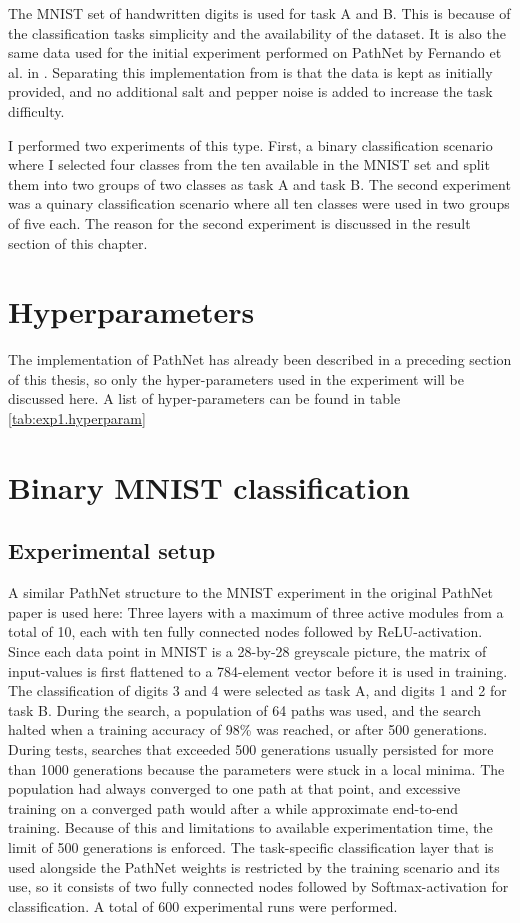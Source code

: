 The MNIST set of handwritten digits is used for task A and B. This is because of the classification tasks simplicity and the availability of the dataset. It is also the same data used for the initial experiment performed on PathNet by Fernando et al. in \cite{pathnet}. Separating this implementation from \cite{pathnet} is that the data is kept as initially provided, and no additional salt and pepper noise is added to increase the task difficulty. 


I performed two experiments of this type. First, a binary classification scenario where I selected four classes from the ten available in the MNIST set and split them into two groups of two classes as task A and task B. The second experiment was a quinary classification scenario where all ten classes were used in two groups of five each. The reason for the second experiment is discussed in the result section of this chapter. 

\section{Hyperparameters}
\label{exp1:implementation}
The implementation of PathNet has already been described in a preceding section of this thesis, so only the hyper-parameters used in the experiment will be discussed here. A list of hyper-parameters can be found in table \ref{tab:exp1.hyperparam}



\section{Binary MNIST classification}

\subsection{Experimental setup}
A similar PathNet structure to the MNIST experiment in the original PathNet paper is used here: Three layers with a maximum of three active modules from a total of 10, each with ten fully connected nodes followed by ReLU-activation. Since each data point in MNIST is a 28-by-28 greyscale picture, the matrix of input-values is first flattened to a 784-element vector before it is used in training. The classification of digits 3 and 4 were selected as task A, and digits 1 and 2 for task B. 
During the search, a population of 64 paths was used, and the search halted when a training accuracy of 98\% was reached, or after 500 generations. During tests, searches that exceeded 500 generations usually persisted for more than 1000 generations because the parameters were stuck in a local minima. The population had always converged to one path at that point, and excessive training on a converged path would after a while approximate end-to-end training. Because of this and limitations to available experimentation time, the limit of 500 generations is enforced. The task-specific classification layer that is used alongside the PathNet weights is restricted by the training scenario and its use, so it consists of two fully connected nodes followed by Softmax-activation for classification. A total of 600 experimental runs were performed.


